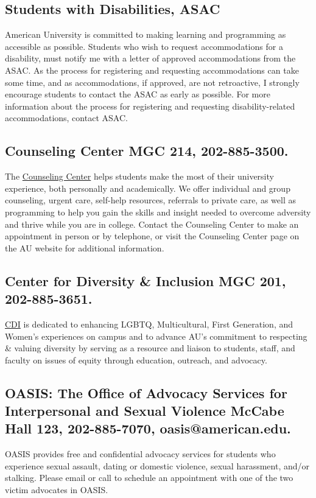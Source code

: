 \subsection{Students with Disabilities, ASAC} American University
is committed to making learning and programming as accessible as
possible. Students who wish to request accommodations for a
disability, must notify me with a letter of approved
accommodations from the ASAC. As the process for registering and
requesting accommodations can take some time, and as
accommodations, if approved, are not retroactive, I strongly
encourage students to contact the ASAC as early as possible. For
more information about the process for registering and requesting
disability-related accommodations, contact ASAC.

\subsection{Counseling Center MGC 214, 202-885-3500.} The
\href{http://www.american.edu/counseling}{Counseling Center} helps students make the most of their
university experience, both personally and academically. We offer
individual and group counseling, urgent care, self-help
resources, referrals to private care, as well as programming to
help you gain the skills and insight needed to overcome adversity
and thrive while you are in college. Contact the Counseling
Center to make an appointment in person or by telephone, or visit
the Counseling Center page on the AU website for additional
information.

\subsection{Center for Diversity \& Inclusion MGC 201,
202-885-3651.} \href{http://www.american.edu/ocl/cdi/}{CDI} is dedicated to enhancing LGBTQ,
Multicultural, First Generation, and Women's experiences on
campus and to advance AU's commitment to respecting \& valuing
diversity by serving as a resource and liaison to students,
staff, and faculty on issues of equity through education,
outreach, and advocacy.

\subsection{OASIS: The Office of Advocacy Services for
Interpersonal and Sexual Violence McCabe Hall 123, 202-885-7070,
oasis@american.edu.} OASIS provides free and confidential
advocacy services for students who experience sexual assault,
dating or domestic violence, sexual harassment, and/or stalking.
Please email or call to schedule an appointment with one of the
two victim advocates in OASIS.

